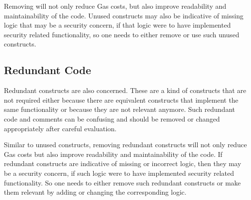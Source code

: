 Removing will not only reduce Gas costs, but also improve readability
and maintainability of the code. Unused constructs may also be
indicative of missing logic that may be a security concern, if that
logic were to have implemented security related functionality, so one
needs to either remove or use such unused constructs.

\subsection{Redundant Code}\label{redundant-code}

Redundant constructs are also concerned. These are a kind of constructs
that are not required either because there are equivalent constructs
that implement the same functionality or because they are not relevant
anymore. Such redundant code and comments can be confusing and should be
removed or changed appropriately after careful evaluation.

Similar to unused constructs, removing redundant constructs will not
only reduce Gas costs but also improve readability and maintainability
of the code. If redundant constructs are indicative of missing or
incorrect logic, then they may be a security concern, if such logic were
to have implemented security related functionality. So one needs to
either remove such redundant constructs or make them relevant by adding
or changing the corresponding logic.
